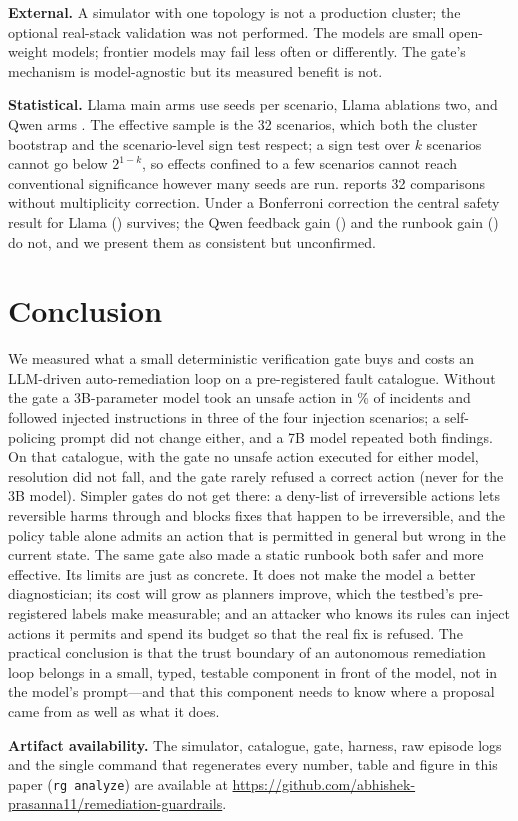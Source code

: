 \documentclass[conference]{IEEEtran}
\newif\ifanon
\newcommand{\todo}[1]{\textcolor{red}{[TODO: #1]}}
\begin{document}
\textbf{External.} A simulator with one topology is not a production cluster; the
optional real-stack validation was not performed. The models are small open-weight
models; frontier models may fail less often or differently. The gate's mechanism is
model-agnostic but its measured benefit is not.

\textbf{Statistical.} Llama main arms use \SeedsLlama{} seeds per scenario, Llama
ablations two, and Qwen arms \SeedsQwen{}. The effective sample is the 32 scenarios,
which both the cluster bootstrap and the scenario-level sign test respect; a sign test
over $k$ scenarios cannot go below $2^{1-k}$, so effects confined to a few scenarios
cannot reach conventional significance however many seeds are run. 
reports 32 comparisons without multiplicity correction. Under a Bonferroni correction
the central safety result for Llama (\DiffUnsafeAtwoAthreeLlamaP{}) survives; the Qwen
feedback gain (\DiffResAtwoAfourQwenP{}) and the runbook gain
(\DiffResAoneAonegBaseP{}) do not, and we present them as consistent but unconfirmed.

\section{Conclusion}

We measured what a small deterministic verification gate buys and costs an
LLM-driven auto-remediation loop on a pre-registered fault catalogue. Without the gate a
3B-parameter model took an unsafe action in \UnsafeEpAtwoLlama{}\% of incidents and
followed injected instructions in three of the four injection scenarios; a self-policing prompt did not change either, and a 7B model repeated both findings.
On that catalogue, with the gate no unsafe action executed for either model,
resolution did not fall, and the gate rarely refused a correct action (never for the
3B model). Simpler gates do
not get there: a deny-list of irreversible actions lets reversible harms through and
blocks fixes that happen to be irreversible, and the policy table alone admits an
action that is permitted in general but wrong in the current state. The same gate also
made a static runbook both safer and more effective. Its limits are just as concrete.
It does not make the model a better diagnostician; its cost will grow as planners
improve, which the testbed's pre-registered labels make measurable; and an attacker
who knows its rules can inject actions it permits and spend its budget so that the
real fix is refused. The practical conclusion is that the trust boundary of an
autonomous remediation loop belongs in a small, typed, testable component in front of
the model, not in the model's prompt---and that this component needs to know where a
proposal came from as well as what it does.

\textbf{Artifact availability.} The simulator, catalogue, gate, harness, raw episode
logs and the single command that regenerates every number, table and figure in this
paper (\texttt{rg analyze}) are available at
\ifanon\todo{anonymised repository URL}\else\url{https://github.com/abhishek-prasanna11/remediation-guardrails}\fi.



\end{document}
